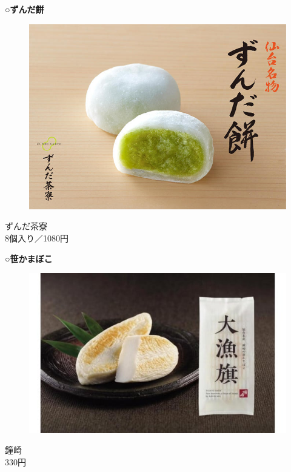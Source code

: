 \begin{minipage}{0.45\textwidth}
	\textbf{○ずんだ餅}
	\begin{figure}[H]
		\centering
		\includegraphics[width=0.65\linewidth]{img/zunda}
	\end{figure}
	\begin{center}
		{\scriptsize{ずんだ茶寮\\8個入り／1080円}}
	\end{center}
	\textbf{○笹かまぼこ}
	\begin{figure}[H]
		\centering
		\includegraphics[width=0.7\linewidth]{img/sasakama}
	\end{figure}
	\begin{center}
		{\scriptsize{鐘崎\\330円}}
	\end{center}
	
\end{minipage}
\hspace*{0.5em}
